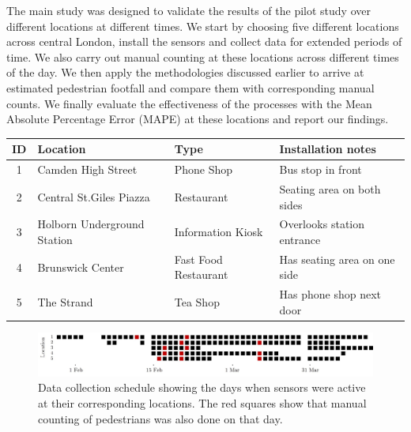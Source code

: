 The main study was designed to validate the results of the pilot study over different locations at different times. We start by choosing five different locations across central London, install the sensors and collect data for extended periods of time. 
We also carry out manual counting at these locations across different times of the day. 
We then apply the methodologies discussed earlier to arrive at estimated pedestrian footfall and compare them with corresponding manual counts.
We finally evaluate the effectiveness of the processes with the Mean Absolute Percentage Error (MAPE) at these locations and report our findings.

\begin{table}
	{\begin{tabular}{clll} 
		\toprule
		 ID & Location & Type & Installation notes\\
		 \midrule
		 1 & Camden High Street & Phone Shop & Bus stop in front\\
		 2 & Central St.Giles Piazza & Restaurant & Seating area on both sides\\
		 3 & Holborn Underground Station & Information Kiosk & Overlooks station entrance\\
		 4 & Brunswick Center & Fast Food Restaurant & Has seating area on one side\\
		 5 & The Strand & Tea Shop & Has phone shop next door \\
		 \bottomrule
	\end{tabular}}
	\label{locations-table}
\end{table}

\begin{figure}
	\begin{center}
		\includegraphics [width=0.90\linewidth] {images/main_schedule.jpeg}
		\caption{Data collection schedule showing the days when sensors were active at their corresponding locations. The red squares show that manual counting of pedestrians was also done on that day.}
		\label{main_schedule}
	\end{center}
\end{figure}

